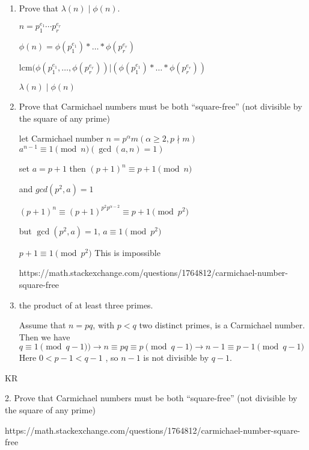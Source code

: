 \begin{enumerate}
    \item  Prove that $\lambda(n) \mid \phi(n)$.
    
    $n = p_1^{e_1} \cdots p_r^{e_r}$

    $ \phi(n) = \phi(p_1^{e_1})* \ldots*\phi(p_r^{e_r})$

    $\text{lcm}(\phi(p_1^{e_1}, \ldots, \phi(p_r^{e_r})) | (\phi(p_1^{e_1})* \ldots*\phi(p_r^{e_r}))$
    
    $\lambda(n) \mid \phi(n)$

    \item  Prove that Carmichael numbers must be both “square-free” (not divisible by the square of any prime) 

    let Carmichael number $n = p^\alpha m( \alpha \ge 2 ,  p \nmid m )$
    $a^{n-1} \equiv 1 \pmod{n} (\gcd(a,n) = 1)$
    
    set $a = p+1 $ then $(p+1)^{n} \equiv p+1 \pmod{n}$
    
    and $gcd(p^2,a) = 1$
    
    $(p+1)^{n} \equiv (p+1)^{p^2 p^{\alpha-2}} \equiv p+1 \pmod{p^2}$
    
    but $\gcd(p^2,a) = 1$,  $ a \equiv 1 \pmod{p^2}$
    
    $p+1 \equiv 1 \pmod{p^2}$ This is impossible
    
    https://math.stackexchange.com/questions/1764812/carmichael-number-square-free


    
    \item  the product of at least three primes. 
    
    Assume that $n=pq$, with $p<q$ two distinct primes, is a Carmichael number. 
    Then we have 
    $q≡1 \pmod{q−1} )\rightarrow n \equiv pq \equiv p \pmod{q−1}  \rightarrow n−1 \equiv p−1 \pmod{q−1}$
    Here $0 < p−1 < q−1$ , so $n−1$ is not divisible by $q−1$.

    

\end{enumerate}



KR

2. Prove that Carmichael numbers must be both “square-free” (not divisible by the square of any prime) 

https://math.stackexchange.com/questions/1764812/carmichael-number-square-free


